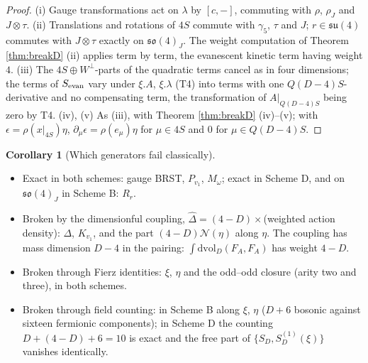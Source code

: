 \documentclass[11pt]{article}
\theoremstyle{definition}
\newtheorem{corollary}[definition]{Corollary}
\numberwithin{equation}{section}
\begin{document}
\begin{proof}
(i) Gauge transformations act on $\lambda$ by $[c,-]$, commuting with $\rho$, $\rho_J$ and $J\otimes\tau$. (ii) Translations and rotations of $4S$ commute with $\gamma_5$, $\tau$ and $J$; $r\in\mathfrak{su}(4)$ commutes with $J\otimes\tau$ exactly on $\mathfrak{so}(4)_J$. The weight computation of Theorem \ref{thm:breakD} (ii) applies term by term, the evanescent kinetic term having weight $4$. (iii) The $4S\oplus W^\perp$-parts of the quadratic terms cancel as in four dimensions; the terms of $S_{\rm evan}$ vary under $\xi.A$, $\xi.\lambda$ (T4) into terms with one $Q(D{-}4)S$-derivative and no compensating term, the transformation of $A|_{Q(D-4)S}$ being zero by T4. (iv), (v) As (iii), with Theorem \ref{thm:breakD} (iv)--(v); with $\epsilon=\rho(x|_{4S})\eta$, $\partial_\mu\epsilon=\rho(e_\mu)\eta$ for $\mu\in4S$ and $0$ for $\mu\in Q(D{-}4)S$.
\end{proof}

\begin{corollary}[Which generators fail classically]
\label{cor:fail}
\mbox{}\begin{itemize}
\item Exact in both schemes: gauge BRST, $P_{v_1}$, $M_\omega$; exact in Scheme D, and on $\mathfrak{so}(4)_J$ in Scheme B: $R_r$.
\item Broken by the dimensionful coupling, $\widehat\Delta=(4-D)\times$(weighted action density): $\Delta$, $K_{v_1}$, and the part $(4-D)\mathcal N(\eta)$ along $\eta$. The coupling has mass dimension $D-4$ in the pairing: $\int\mathrm{dvol}_D(F_A,F_A)$ has weight $4-D$.
\item Broken through Fierz identities: $\xi$, $\eta$ and the odd--odd closure (arity two and three), in both schemes.
\item Broken through field counting: in Scheme B along $\xi$, $\eta$ ($D+6$ bosonic against sixteen fermionic components); in Scheme D the counting $D+(4-D)+6=10$ is exact and the free part of $\{S_D,S^{(1)}_D(\xi)\}$ vanishes identically.
\end{itemize}
\end{corollary}
\end{document}
